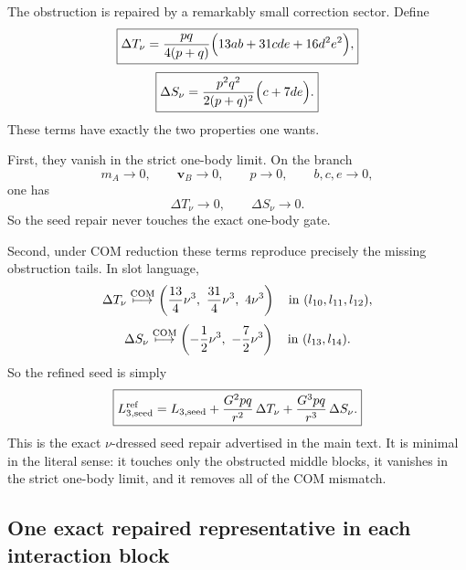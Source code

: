 \documentclass[11pt]{article}
\begin{document}
The obstruction is repaired by a remarkably small correction sector.  Define
\begin{equation}
\boxed{
\Delta T_\nu
=
\frac{pq}{4(p+q)}\Bigl(13ab+31cde+16d^2e^2\Bigr),}
\label{eq:app-com-proj-DeltaTnu}
\end{equation}
\begin{equation}
\boxed{
\Delta S_\nu
=
\frac{p^2q^2}{2(p+q)^2}\Bigl(c+7de\Bigr).}
\label{eq:app-com-proj-DeltaSnu}
\end{equation}
These terms have exactly the two properties one wants.

First, they vanish in the strict one-body limit.  On the branch
\begin{equation}
 m_A\to 0,
 \qquad
 \mathbf v_B\to 0,
 \qquad
 p\to 0,
 \qquad
 b,c,e\to 0,
\label{eq:app-com-proj-testmass-branch}
\end{equation}
one has
\begin{equation}
\boxed{\Delta T_\nu\to 0,
\qquad
\Delta S_\nu\to 0.}
\label{eq:app-com-proj-repair-onebody}
\end{equation}
So the seed repair never touches the exact one-body gate.

Second, under COM reduction these terms reproduce precisely the missing
obstruction tails.  In slot language,
\begin{equation}
\Delta T_\nu\stackrel{\rm COM}{\longmapsto}
\left(\frac{13}{4}\nu^3,\ \frac{31}{4}\nu^3,\ 4\nu^3\right)
\quad\text{in }(l_{10},l_{11},l_{12}),
\label{eq:app-com-proj-DeltaTnu-image}
\end{equation}
\begin{equation}
\Delta S_\nu\stackrel{\rm COM}{\longmapsto}
\left(-\frac12\nu^3,\ -\frac72\nu^3\right)
\quad\text{in }(l_{13},l_{14}).
\label{eq:app-com-proj-DeltaSnu-image}
\end{equation}
So the refined seed is simply
\begin{equation}
\boxed{
L_{3,\rm seed}^{\rm ref}
=
L_{3,\rm seed}
+\frac{G^2pq}{r^2}\,\Delta T_\nu
+\frac{G^3pq}{r^3}\,\Delta S_\nu.}
\label{eq:app-com-proj-refined-seed}
\end{equation}
This is the exact $\nu$-dressed seed repair advertised in the main text.  It is
minimal in the literal sense: it touches only the obstructed middle blocks, it
vanishes in the strict one-body limit, and it removes all of the COM mismatch.

\subsection{One exact repaired representative in each interaction block}
\label{app:com-proj-representatives}
\end{document}

